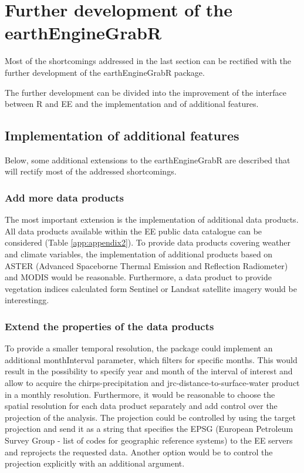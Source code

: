 \section{Further development of the earthEngineGrabR}

Most of the shortcomings addressed in the last section can be rectified with the further development of the earthEngineGrabR package. 

The further development can be divided into the improvement of the interface between R and EE and the implementation and of additional features.

\subsection{Implementation of additional features}

Below, some additional extensions to the earthEngineGrabR are described that will rectify most of the addressed shortcomings.

\subsubsection{Add more data products}

The most important extension is the implementation of additional data products. All data products available within the EE public data catalogue can be considered (Table \ref{app:appendix2}). To provide data products covering weather and climate variables, the implementation of additional products based on ASTER (Advanced Spaceborne Thermal Emission and Reflection Radiometer) and MODIS would be reasonable. Furthermore, a data product to provide vegetation indices calculated form Sentinel or Landsat satellite imagery would be interestingg.

\subsubsection{Extend the properties of the data products}
To provide a smaller temporal resolution, the package could implement an additional monthInterval parameter, which filters for specific months. This would result in the possibility to specify year and month of the interval of interest and allow to acquire the chirps-precipitation and jrc-distance-to-surface-water product in a monthly resolution.
Furthermore, it would be reasonable to choose the spatial resolution for each data product separately and add control over the projection of the analysis. 
The projection could be controlled by using the target projection and send it as a string that specifies the EPSG (European Petroleum Survey Group - list of codes for geographic reference systems) to the EE servers and reprojects the requested data. Another option would be to control the projection explicitly with an additional argument.


